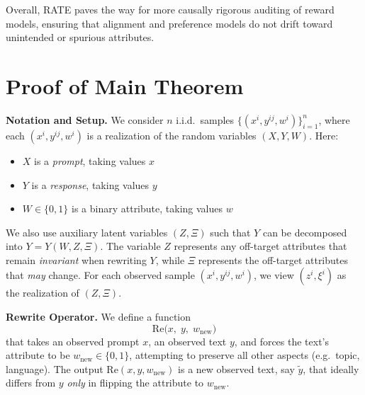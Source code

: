 \documentclass{article}
\theoremstyle{definition}
\begin{document}
Overall, RATE paves the way for more causally rigorous auditing of reward models, ensuring that alignment and preference models do not drift toward unintended or spurious attributes.

\newpage
\appendix
\section{Proof of Main Theorem}
\label{sec:proofs}
    \noindent
    \textbf{Notation and Setup.}  
    We consider $n$ i.i.d.\ samples $\{(x^i, y^{ij}, w^i)\}_{i=1}^n$, where each $(x^i, y^{ij}, w^i)$ is a realization of the random variables $(X, Y, W)$. Here:
    \begin{itemize}
        \item $X$ is a \emph{prompt}, taking values $x$
        \item $Y$ is a \emph{response}, taking values $y$
        \item $W \in \{0,1\}$ is a binary attribute, taking values $w$
    \end{itemize}
    We also use auxiliary latent variables $(Z, \Xi)$ such that $Y$ can be decomposed into $Y = Y(W, Z, \Xi)$. The variable $Z$ represents any off-target attributes that remain \emph{invariant} when rewriting $Y$, while $\Xi$ represents the off-target attributes that \emph{may} change. For each observed sample $(x^i, y^{ij}, w^i)$, we view $(z^i,\xi^i)$ as the realization of $(Z, \Xi)$.
    
    \bigskip
    
    \noindent
    \textbf{Rewrite Operator.}
    We define a function
    \[
    \text{Re}\bigl(x,\;y,\;w_{\text{new}}\bigr)
    \]
    that takes an observed prompt \(x\), an observed text \(y\), and forces the text’s attribute to be \(w_{\text{new}}\in\{0,1\}\), attempting to preserve all other aspects (e.g.\ topic, language). The output \(\text{Re}(x,y,w_{\text{new}})\) is a new observed text, say \(\tilde{y}\), that ideally differs from \(y\) \emph{only} in flipping the attribute to \(w_{\text{new}}\).
    
    \bigskip
    
\end{document}
